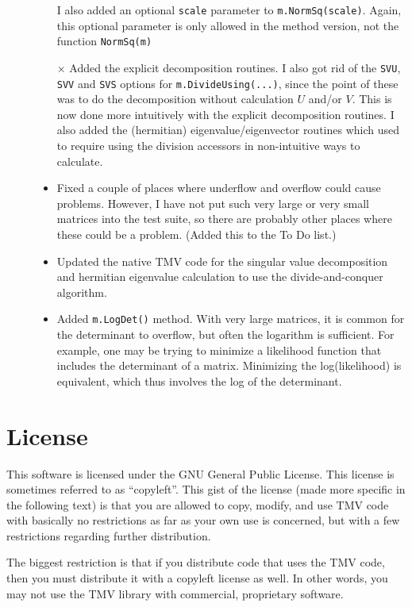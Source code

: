 \documentclass[twoside,letterpaper,11pt]{article}
\renewcommand{\tt}[1]{{\texttt {#1}}}
\begin{document}
\begin{description}
\begin{itemize}
I also added an optional \tt{scale} parameter to \tt{m.NormSq(scale)}.
Again, this optional parameter is only allowed in the method version, not the function \tt{NormSq(m)}
\item[$\times$]
Added the explicit decomposition routines.  I also
got rid of the \tt{SVU}, \tt{SVV} and \tt{SVS} options for \tt{m.DivideUsing(...)}, since the point 
of these was to do the decomposition without calculation $U$ and/or $V$.  This is now done
more intuitively with the explicit decomposition routines.
I also added the (hermitian) eigenvalue/eigenvector routines which used to
require using the division accessors in non-intuitive ways to calculate.
\item 
Fixed a couple of places where underflow and overflow could cause problems.  However, I have
not put such very large or very small matrices into the test suite, so there are probably other
places where these could be a problem.  (Added this to the To Do list.)
\item
Updated the native TMV code for the singular value decomposition and hermitian 
eigenvalue calculation to use the divide-and-conquer algorithm.
\item
Added \tt{m.LogDet()} method.  With very large matrices, it is common for the determinant
to overflow, but often the logarithm is sufficient.  For example, one may be trying to minimize a 
likelihood function that
includes the determinant of a matrix.  Minimizing the log(likelihood) is equivalent, which
thus involves the log of the determinant.  
\end{itemize}

\end{description}

\newpage
\section{License}
\label{license}

This software is licensed under the GNU General Public License.  This license is
sometimes referred to as ``copyleft''.  This gist of the license (made more specific
in the following text) is that you are allowed to copy, modify, and use TMV code
with basically no restrictions as far as your own use is concerned, 
but with a few restrictions regarding further distribution.

The biggest restriction is that if you distribute code that
uses the TMV code, then you must distribute it with a copyleft license as well.
In other words, you may not use the TMV library with commercial, proprietary 
software. 
\end{document}
